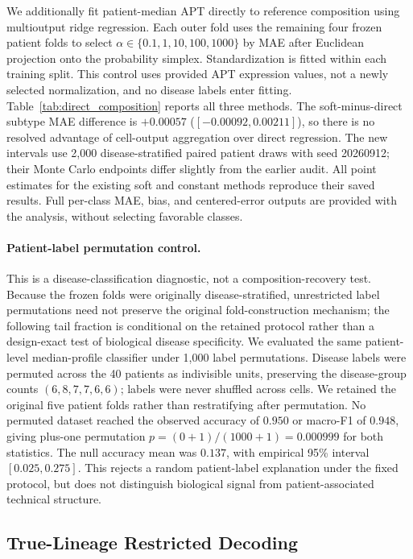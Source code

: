 \documentclass{article} %
\begin{document}
We additionally fit patient-median APT directly to reference composition using
multioutput ridge regression. Each outer fold uses the remaining four frozen
patient folds to select $\alpha\in\{0.1,1,10,100,1000\}$ by MAE after
Euclidean projection onto the probability simplex. Standardization is fitted
within each training split. This control uses provided APT expression values,
not a newly selected normalization, and no disease labels enter fitting.
Table~\ref{tab:direct_composition} reports all three methods. The soft-minus-direct
subtype MAE difference is $+0.00057$ ($[-0.00092,0.00211]$), so there is no
resolved advantage of cell-output aggregation over direct regression.
The new intervals use 2,000 disease-stratified paired patient draws with seed
20260912; their Monte Carlo endpoints differ slightly from the earlier audit.
All point estimates for the existing soft and constant methods reproduce
their saved results. Full per-class MAE, bias, and centered-error outputs are
provided with the analysis, without selecting favorable classes.


\paragraph{Patient-label permutation control.}
This is a disease-classification diagnostic, not a composition-recovery test.
Because the frozen folds were originally disease-stratified, unrestricted
label permutations need not preserve the original fold-construction mechanism;
the following tail fraction is conditional on the retained protocol rather
than a design-exact test of biological disease specificity.
We evaluated the same patient-level median-profile classifier under 1,000 label permutations. Disease labels were permuted across the 40 patients as indivisible units, preserving the disease-group counts $(6,8,7,7,6,6)$; labels were never shuffled across cells. We retained the original five patient folds rather than restratifying after permutation. No permuted dataset reached the observed accuracy of $0.950$ or macro-F1 of $0.948$, giving plus-one permutation $p=(0+1)/(1000+1)=0.000999$ for both statistics. The null accuracy mean was $0.137$, with empirical 95\% interval $[0.025,0.275]$. This rejects a random patient-label explanation under the fixed protocol, but does not distinguish biological signal from patient-associated technical structure.

\subsection{True-Lineage Restricted Decoding}
\label{sec:appendix:true_lineage_oracle}
\end{document}
